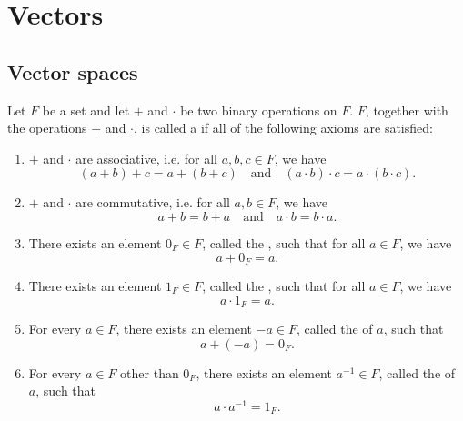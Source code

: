 \chapter{Vectors}\label{chap:vectors}

\section{Vector spaces}

\begin{defn}
Let $ F $ be a set and let $ + $ and $ \cdot $ be two binary operations on $ F $. $ F $, together with the operations $ + $ and $ \cdot $, is called a  if all of the following axioms are satisfied:
\begin{enumerate}
    \item $ + $ and $ \cdot $ are associative, i.e. for all $ a,b,c\in F $, we have
    \begin{equation*}
        (a+b)+c=a+(b+c) \quad\text{and}\quad (a\cdot b)\cdot c=a\cdot(b\cdot c).
    \end{equation*}

    \item $ + $ and $ \cdot $ are commutative, i.e. for all $ a,b\in F $, we have
    \begin{equation*}
        a+b=b+a \quad\text{and}\quad a\cdot b=b\cdot a.
    \end{equation*}

    \item There exists an element $ 0_F\in F $, called the , such that for all $ a\in F $, we have
    \begin{equation*}
        a+0_F=a.
    \end{equation*}

    \item There exists an element $ 1_F\in F $, called the , such that for all $ a\in F $, we have
    \begin{equation*}
        a\cdot 1_F=a.
    \end{equation*}

    \item For every $ a\in F $, there exists an element $ -a\in F $, called the  of $ a $, such that
    \begin{equation*}
        a+(-a)=0_F.
    \end{equation*}

    \item For every $ a\in F $ other than $ 0_F $, there exists an element $ a^{-1}\in F $, called the  of $ a $, such that
    \begin{equation*}
        a\cdot a^{-1}=1_F.
    \end{equation*}


\end{enumerate}
\end{defn}
